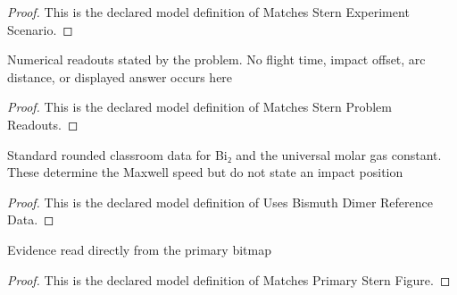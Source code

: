 \begin{proof}
  This is the declared model definition of Matches Stern Experiment Scenario.
\end{proof}
\begin{definition}
  \label{def:physics:phyx-mini-0564:phyxminiproblems-problemphyxmini0564-matchessternproblemreadouts}
  Numerical readouts stated by the problem. No flight time, impact offset, arc distance, or displayed answer occurs here
\end{definition}
\begin{proof}
  This is the declared model definition of Matches Stern Problem Readouts.
\end{proof}
\begin{definition}
  \label{def:physics:phyx-mini-0564:phyxminiproblems-problemphyxmini0564-usesbismuthdimerreferencedata}
  Standard rounded classroom data for Bi₂ and the universal molar gas constant. These determine the Maxwell speed but do not state an impact position
\end{definition}
\begin{proof}
  This is the declared model definition of Uses Bismuth Dimer Reference Data.
\end{proof}
\begin{definition}
  \label{def:physics:phyx-mini-0564:phyxminiproblems-problemphyxmini0564-matchesprimarysternfigure}
  Evidence read directly from the primary bitmap
\end{definition}
\begin{proof}
  This is the declared model definition of Matches Primary Stern Figure.
\end{proof}
